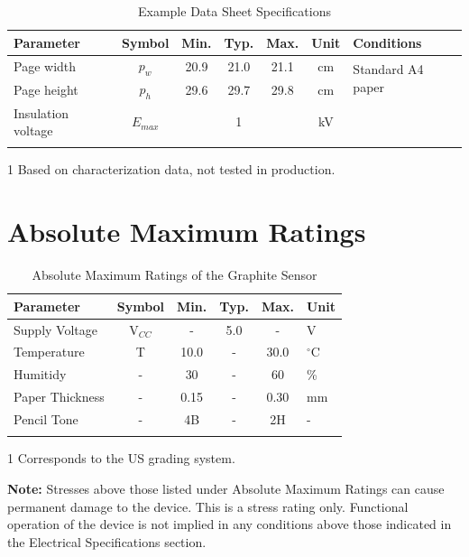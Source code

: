 \documentclass[10pt]{datasheet}
\begin{document}
\begin{table}[h]
\begin{threeparttable}
\caption{Example Data Sheet Specifications}
\begin{tabularx}{\textwidth}{l | c | c c c | c | X}
    \thickhline
    \textbf{Parameter} & \textbf{Symbol} & \textbf{Min.} & \textbf{Typ.} & \textbf{Max.} &
    \textbf{Unit} & \textbf{Conditions} \\
    \hline
    Page width  & $p_w$ & 20.9 & 21.0 & 21.1 & cm & \multirow{2}{*}{Standard A4 paper} \\
    Page height & $p_h$ & 29.6 & 29.7 & 29.8 & cm &  \\
    \hline
    Insulation voltage & $E_{max}$\tnote{1} & & 1 & & kV & \\
    \thickhline
\end{tabularx}
\begin{tablenotes}
\item[1]{Based on characterization data, not tested in production.}
\end{tablenotes}
\end{threeparttable}
\end{table}

\section{Absolute Maximum Ratings}

\begin{table}[h!]
\begin{threeparttable}
\caption{Absolute Maximum Ratings of the Graphite Sensor}
\begin{tabularx}{\textwidth}{l | c | c c c | X}
    \thickhline
    \textbf{Parameter} & \textbf{Symbol} & \textbf{Min.} & \textbf{Typ.} & \textbf{Max.} & \textbf{Unit} \\
    \hline
    Supply Voltage & V$_{CC}$ & - & 5.0 & - & V \\
    \hline
    Temperature & T & 10.0 & - & 30.0 & $^\circ$C \\
    Humitidy & - & 30 & - & 60 & \% \\
    \hline
    Paper Thickness & - & 0.15 & - & 0.30 & mm \\
    Pencil Tone\tnote{1} & - & 4B & - & 2H & - \\
    \thickhline
\end{tabularx}
\begin{tablenotes}
\item[1]{Corresponds to the US grading system.}
\end{tablenotes}
\end{threeparttable}
\end{table}

\textbf{Note:} Stresses above those listed under Absolute Maximum Ratings can
cause permanent damage to the device. This is a stress rating only. Functional
operation of the device is not implied in any conditions above those indicated
in the Electrical Specifications section.
\end{document}

